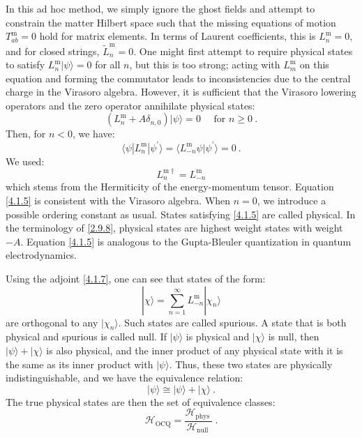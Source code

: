 In this ad hoc method, we simply ignore the ghost fields and attempt to constrain the matter Hilbert space such that the missing equations of motion $T_{a b}^{\mathrm{m}}=0$ hold for matrix elements. In terms of Laurent coefficients, this is $L_{n}^{\mathrm{m}}=0$, and for closed strings, $\tilde{L}_{n}^{\mathrm{m}}=0$. One might first attempt to require physical states to satisfy $L_{n}^{\mathrm{m}}|\psi\rangle=0$ for all $n$, but this is too strong; acting with $L_{m}^{\mathrm{m}}$ on this equation and forming the commutator leads to inconsistencies due to the central charge in the Virasoro algebra.
However, it is sufficient that the Virasoro lowering operators and the zero operator annihilate physical states:
\begin{equation}\label{4.1.5}
	(L_{n}^{\mathrm{m}}+A \delta_{n, 0})|\psi\rangle=0 \quad \text { for } n \geq 0 \:.
\end{equation}
Then, for $n<0$, we have:
\begin{equation}
	\langle\psi |L_{n}^{\mathrm{m}} | \psi^{\prime}\rangle= \langle L_{-n}^{\mathrm{m}} \psi \vert \psi^{\prime}\rangle=0 \:. \label{4.1.6}
\end{equation}
We used:
\begin{equation}\label{4.1.7}
	L_{n}^{\mathrm{m} \dagger}=L_{-n}^{\mathrm{m}}
\end{equation}
which stems from the Hermiticity of the energy-momentum tensor. Equation \eqref{4.1.5} is consistent with the Virasoro algebra. When $n=0$, we introduce a possible ordering constant as usual. States satisfying \eqref{4.1.5} are called physical. In the terminology of \eqref{2.9.8}, physical states are highest weight states with weight $-A$. Equation \eqref{4.1.5} is analogous to the Gupta-Bleuler quantization in quantum electrodynamics.

Using the adjoint \eqref{4.1.7}, one can see that states of the form:
\begin{equation}\label{4.1.8}
	|\chi\rangle=\sum_{n=1}^{\infty} L_{-n}^{\mathrm{m}}|\chi_{n}\rangle
\end{equation}
are orthogonal to any $|\chi_{n}\rangle$. Such states are called spurious. A state that is both physical and spurious is called null. If $|\psi\rangle$ is physical and $|\chi\rangle$ is null, then $|\psi\rangle+|\chi\rangle$ is also physical, and the inner product of any physical state with it is the same as its inner product with $|\psi\rangle$. Thus, these two states are physically indistinguishable, and we have the equivalence relation:
\begin{equation}
	|\psi\rangle \cong  |\psi\rangle+|\chi\rangle \:. \label{4.1.9}
\end{equation}
The true physical states are then the set of equivalence classes:
\begin{equation}
	\mathscr{H}_{\mathrm{OCQ}}=\frac{\mathscr{H}_{\text {phys }}}{\mathscr{H}_{\text {null }}} \:. \label{4.1.10}
\end{equation}

